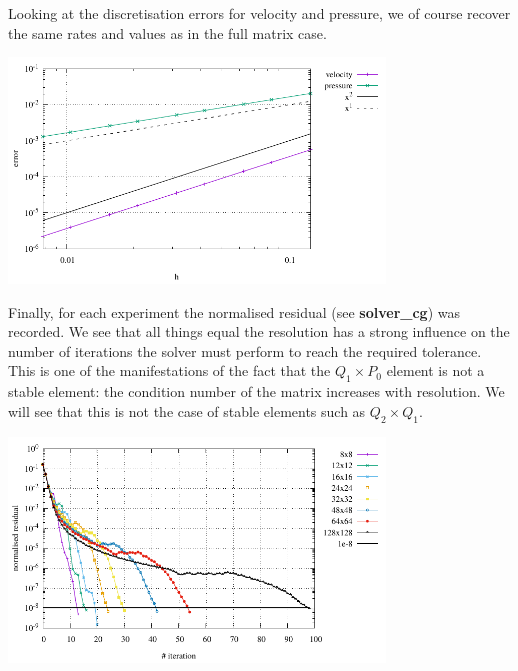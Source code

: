 Looking at the discretisation errors for velocity and pressure, we 
of course recover the same rates and values as in the full matrix case.

\begin{center}
\includegraphics[width=10cm]{python_codes/fieldstone_15/results/errors.pdf}
\end{center}

Finally, for each experiment the normalised residual (see {\bf solver\_cg}) was recorded. We see that 
all things equal the resolution has a strong influence on the number of iterations the solver must
perform to reach the required tolerance. This is one of the manifestations of the fact that the 
$Q_1 \times P_0$ element is not a stable element: the condition number of the matrix increases with 
resolution. We will see that this is not the case of stable elements such as $Q_2\times Q_1$.

\begin{center}
\includegraphics[width=10cm]{python_codes/fieldstone_15/results/residual.pdf}
\end{center}

